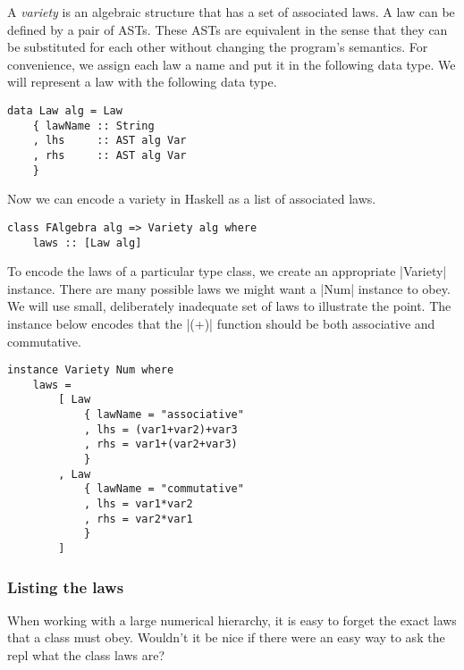 \documentclass[preprint]{sigplanconf}
\theoremstyle{definition}
\begin{document}
A \emph{variety} is an algebraic structure that has a set of associated laws.
A law can be defined by a pair of ASTs.
These ASTs are equivalent in the sense that they can be substituted for each other without changing the program's semantics.
For convenience, we assign each law a name and put it in the following data type.
We will represent a law with the following data type.
\begin{lstlisting}
data Law alg = Law
    { lawName :: String
    , lhs     :: AST alg Var
    , rhs     :: AST alg Var
    }
\end{lstlisting}
Now we can encode a variety in Haskell as a list of associated laws.
\begin{lstlisting}
class FAlgebra alg => Variety alg where
    laws :: [Law alg]
\end{lstlisting}
To encode the laws of a particular type class,
we create an appropriate |Variety| instance.
There are many possible laws we might want a |Num| instance to obey.
We will use small, deliberately inadequate set of laws to illustrate the point.
The instance below encodes that the |(+)| function should be both associative and commutative.
\begin{lstlisting}
instance Variety Num where
    laws =
        [ Law
            { lawName = "associative"
            , lhs = (var1+var2)+var3
            , rhs = var1+(var2+var3)
            }
        , Law
            { lawName = "commutative"
            , lhs = var1*var2
            , rhs = var2*var1
            }
        ]
\end{lstlisting}

\subsubsection{Listing the laws}
When working with a large numerical hierarchy,
it is easy to forget the exact laws that a class must obey.
Wouldn't it be nice if there were an easy way to ask the repl what the class laws are?
\end{document}

